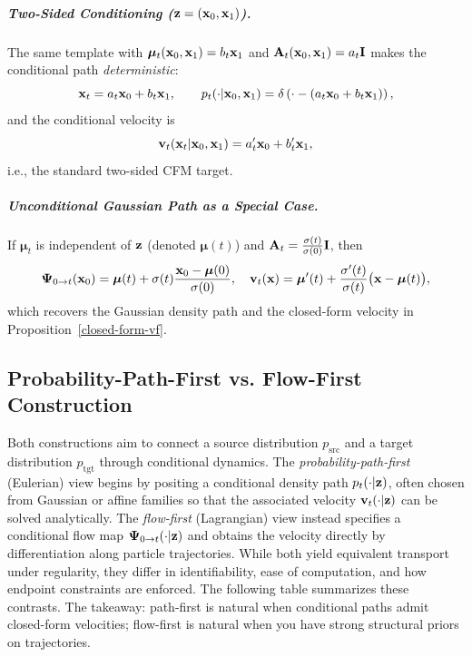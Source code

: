 \subparagraph{Two-Sided Conditioning (${\mathbf{z}}=({\mathbf{x}}_0,{\mathbf{x}}_1)$).}
The same template with $\bm\mu_t({\mathbf{x}}_0,{\mathbf{x}}_1)=b_t {\mathbf{x}}_1$ and ${\mathbf{A}}_t({\mathbf{x}}_0,{\mathbf{x}}_1)=a_t {\mathbf{I}}$ makes the conditional path \emph{deterministic}:
\[
{\mathbf{x}}_t=a_t {\mathbf{x}}_0+b_t {\mathbf{x}}_1,
\qquad
p_t(\cdot|{\mathbf{x}}_0,{\mathbf{x}}_1)=\delta\left(\cdot - (a_t{\mathbf{x}}_0+b_t{\mathbf{x}}_1)\right),
\]
and the conditional velocity is
\[
{\mathbf{v}}_t({\mathbf{x}}_t|{\mathbf{x}}_0,{\mathbf{x}}_1)=a_t' {\mathbf{x}}_0+b_t' {\mathbf{x}}_1,
\]
i.e., the standard two-sided CFM target. 

\subparagraph{Unconditional Gaussian Path as a Special Case.}
If $\bm{\mu}_t$ is independent of ${\mathbf{z}}$ (denoted $\bm{\mu}(t)$) and 
${\mathbf{A}}_t = \tfrac{\sigma(t)}{\sigma(0)} {\mathbf{I}}$, then
\[
{\bm{\Psi}}_{0\to t}({\mathbf{x}}_0)=\bm\mu(t)+\sigma(t) \frac{{\mathbf{x}}_0-\bm\mu(0)}{\sigma(0)},
\quad
{\mathbf{v}}_t({\mathbf{x}})=\bm\mu'(t)+\frac{\sigma'(t)}{\sigma(t)}\bigl({\mathbf{x}}-\bm\mu(t)\bigr),
\]
which recovers the Gaussian density path and the closed-form velocity in Proposition~\ref{closed-form-vf}.





\subsection{Probability-Path-First vs. Flow-First Construction}

Both constructions aim to connect a source distribution $p_{\mathrm{src}}$ and a target distribution $p_{\mathrm{tgt}}$ through conditional dynamics. 
The \emph{probability-path-first} (Eulerian) view begins by positing a conditional density path $p_t(\cdot|{\mathbf{z}})$, often chosen from Gaussian or affine families so that the associated velocity ${\mathbf{v}}_t(\cdot|{\mathbf{z}})$ can be solved analytically. 
The \emph{flow-first} (Lagrangian) view instead specifies a conditional flow map ${\bm{\Psi}}_{0\to t}(\cdot|{\mathbf{z}})$ and obtains the velocity directly by differentiation along particle trajectories. 
While both yield equivalent transport under regularity, they differ in identifiability, ease of computation, and how endpoint constraints are enforced. 
The following table summarizes these contrasts. The takeaway: path-first is natural when conditional paths admit closed-form velocities; flow-first is natural when you have strong structural priors on trajectories.

